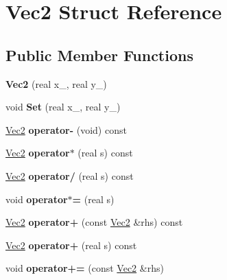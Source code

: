 \hypertarget{struct_vec2}{}\section{Vec2 Struct Reference}
\label{struct_vec2}
\subsection*{Public Member Functions}
\begin{DoxyCompactItemize}
\item 
\mbox{\label{struct_vec2_aa8f28d71ea06633d83c6763122706e4c}} 
{\bfseries Vec2} (real x\+\_\+, real y\+\_\+)
\item 
\mbox{\label{struct_vec2_acc6bbf6848ff83d15304700d30ea0777}} 
void {\bfseries Set} (real x\+\_\+, real y\+\_\+)
\item 
\mbox{\label{struct_vec2_abdef2ee4f2eb705a87fe65df3451abdd}} 
\mbox{\hyperlink{struct_vec2}{Vec2}} {\bfseries operator-\/} (void) const
\item 
\mbox{\label{struct_vec2_a8b9af5c711b30c06184af69a3e90884a}} 
\mbox{\hyperlink{struct_vec2}{Vec2}} {\bfseries operator$\ast$} (real s) const
\item 
\mbox{\label{struct_vec2_aa188e924fa13e126f5078f92297bcc70}} 
\mbox{\hyperlink{struct_vec2}{Vec2}} {\bfseries operator/} (real s) const
\item 
\mbox{\label{struct_vec2_a689c054f9e6c48c5c6d1801e63607164}} 
void {\bfseries operator$\ast$=} (real s)
\item 
\mbox{\label{struct_vec2_acc8d06b96e3f84cd0cb11e5a17fd046b}} 
\mbox{\hyperlink{struct_vec2}{Vec2}} {\bfseries operator+} (const \mbox{\hyperlink{struct_vec2}{Vec2}} \&rhs) const
\item 
\mbox{\label{struct_vec2_add2fd6c94aebeac420f76e21ea02fbd8}} 
\mbox{\hyperlink{struct_vec2}{Vec2}} {\bfseries operator+} (real s) const
\item 
\mbox{\label{struct_vec2_a58f7a9fd50f38f089528cb12af4dd13f}} 
void {\bfseries operator+=} (const \mbox{\hyperlink{struct_vec2}{Vec2}} \&rhs)

\end{DoxyCompactItemize}
